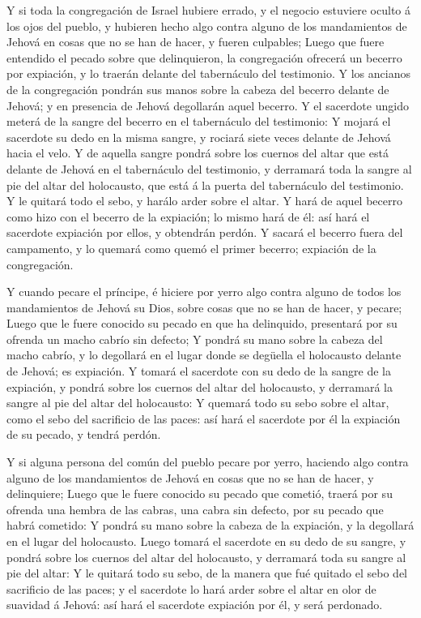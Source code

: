  Y si toda la congregación de Israel hubiere errado, y el
negocio estuviere oculto á los ojos del pueblo, y hubieren hecho algo
contra alguno de los mandamientos de Jehová en cosas que no se han de
hacer, y fueren culpables;  Luego que fuere entendido el
pecado sobre que delinquieron, la congregación ofrecerá un becerro por
expiación, y lo traerán delante del tabernáculo del testimonio.
 Y los ancianos de la congregación pondrán sus manos sobre
la cabeza del becerro delante de Jehová; y en presencia de Jehová
degollarán aquel becerro.  Y el sacerdote ungido meterá de
la sangre del becerro en el tabernáculo del testimonio:  Y
mojará el sacerdote su dedo en la misma sangre, y rociará siete veces
delante de Jehová hacia el velo.  Y de aquella sangre
pondrá sobre los cuernos del altar que está delante de Jehová en el
tabernáculo del testimonio, y derramará toda la sangre al pie del altar
del holocausto, que está á la puerta del tabernáculo del testimonio.
 Y le quitará todo el sebo, y harálo arder sobre el altar.
 Y hará de aquel becerro como hizo con el becerro de la
expiación; lo mismo hará de él: así hará el sacerdote expiación por
ellos, y obtendrán perdón.  Y sacará el becerro fuera del
campamento, y lo quemará como quemó el primer becerro; expiación de la
congregación.

 Y cuando pecare el príncipe, é hiciere por yerro algo
contra alguno de todos los mandamientos de Jehová su Dios, sobre cosas
que no se han de hacer, y pecare;  Luego que le fuere
conocido su pecado en que ha delinquido, presentará por su ofrenda un
macho cabrío sin defecto;  Y pondrá su mano sobre la cabeza
del macho cabrío, y lo degollará en el lugar donde se degüella el
holocausto delante de Jehová; es expiación.  Y tomará el
sacerdote con su dedo de la sangre de la expiación, y pondrá sobre los
cuernos del altar del holocausto, y derramará la sangre al pie del altar
del holocausto:  Y quemará todo su sebo sobre el altar,
como el sebo del sacrificio de las paces: así hará el sacerdote por él
la expiación de su pecado, y tendrá perdón.

 Y si alguna persona del común del pueblo pecare por yerro,
haciendo algo contra alguno de los mandamientos de Jehová en cosas que
no se han de hacer, y delinquiere;  Luego que le fuere
conocido su pecado que cometió, traerá por su ofrenda una hembra de las
cabras, una cabra sin defecto, por su pecado que habrá cometido:
 Y pondrá su mano sobre la cabeza de la expiación, y la
degollará en el lugar del holocausto.  Luego tomará el
sacerdote en su dedo de su sangre, y pondrá sobre los cuernos del altar
del holocausto, y derramará toda su sangre al pie del altar:
 Y le quitará todo su sebo, de la manera que fué quitado el
sebo del sacrificio de las paces; y el sacerdote lo hará arder sobre el
altar en olor de suavidad á Jehová: así hará el sacerdote expiación por
él, y será perdonado.


